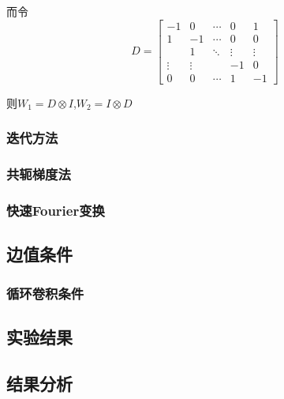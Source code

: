 \documentclass[withoutpreface,bwprint]{cumcmthesis}
\begin{document}
而令
\begin{equation}
D=
\begin{bmatrix}
-1     & 0 & \cdots & 0 &1\\
1      &-1 & \cdots & 0 &0\\
        & 1 & \ddots & \vdots& \vdots\\
\vdots      & \vdots &    &-1  &0\\
0      &0  &\cdots  &1 &-1
\end{bmatrix}
\end{equation}

则$W_{1}=D\otimes I$,$W_{2}=I\otimes D$
\subsubsection{迭代方法}
\subsubsection{共轭梯度法}
\subsubsection{快速Fourier变换}
\subsection{边值条件}
\subsubsection{循环卷积条件}

\subsection{实验结果}

\subsection{结果分析}
\end{document}
